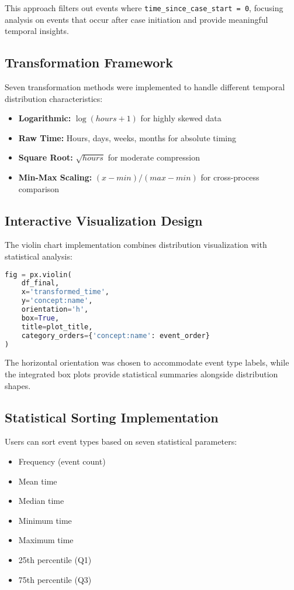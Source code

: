 \documentclass[11pt,a4paper]{article}
\begin{document}
This approach filters out events where \texttt{time\_since\_case\_start = 0}, focusing analysis on events that occur after case initiation and provide meaningful temporal insights.

\subsection{Transformation Framework}

Seven transformation methods were implemented to handle different temporal distribution characteristics:

\begin{itemize}
    \item \textbf{Logarithmic:} $\log(hours + 1)$ for highly skewed data
    \item \textbf{Raw Time:} Hours, days, weeks, months for absolute timing
    \item \textbf{Square Root:} $\sqrt{hours}$ for moderate compression
    \item \textbf{Min-Max Scaling:} $(x - min) / (max - min)$ for cross-process comparison
\end{itemize}

\subsection{Interactive Visualization Design}

The violin chart implementation combines distribution visualization with statistical analysis:

\begin{lstlisting}[language=Python, caption=Violin Chart Generation]
fig = px.violin(
    df_final, 
    x='transformed_time', 
    y='concept:name',
    orientation='h',
    box=True,
    title=plot_title,
    category_orders={'concept:name': event_order}
)
\end{lstlisting}

The horizontal orientation was chosen to accommodate event type labels, while the integrated box plots provide statistical summaries alongside distribution shapes.

\subsection{Statistical Sorting Implementation}

Users can sort event types based on seven statistical parameters:

\begin{itemize}
    \item Frequency (event count)
    \item Mean time
    \item Median time
    \item Minimum time
    \item Maximum time
    \item 25th percentile (Q1)
    \item 75th percentile (Q3)
\end{itemize}
\end{document}
